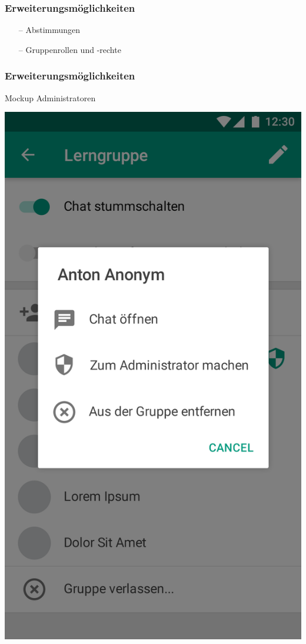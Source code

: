 \documentclass[aspectratio=1610]{beamer}
\begin{document}
  \begin{frame}[plain]
      \frametitle{\textbf{Erweiterungsmöglichkeiten}}
        \begin{itemize}
          \item[--] Abstimmungen
          \item[--] Gruppenrollen und -rechte
        \end{itemize}
  \end{frame}
  
  
  
  \begin{frame}[plain]
      \frametitle{\textbf{Erweiterungsmöglichkeiten}}
		\begin{minipage}{0.45\textwidth}
			Mockup Administratoren
		\end{minipage}	
		\begin{minipage}{0.45\textwidth}
			\includegraphics[height = \paperheight - 50pt]{images/gui-mockups/group_members_context.png}
		\end{minipage}
  \end{frame}
  
\end{document}
